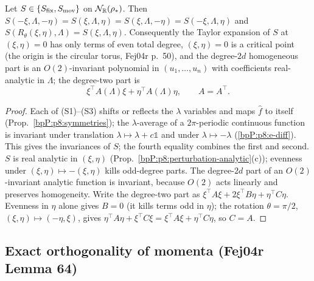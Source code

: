 \begin{corollary}\label{bpP:p8:evenness}
Let $S\in\{S_{\rm fix},S_{\rm mov}\}$ on $\mathcal N_{\mathbb{R}}(\rho_*)$. Then $S(-\xi,\Lambda,-\eta)=S(\xi,\Lambda,\eta)=S(\xi,\Lambda,-\eta)=S(-\xi,\Lambda,\eta)$ and $S(R_\theta(\xi,\eta),\Lambda)=S(\xi,\Lambda,\eta)$. Consequently the Taylor expansion of $S$ at $(\xi,\eta)=0$ has only terms of even total degree, $(\xi,\eta)=0$ is a critical point (the origin is the circular torus, Fej04r p.~50), and the degree-$2d$ homogeneous part is an $O(2)$-invariant polynomial in $(u_1,\dots,u_n)$ with coefficients real-analytic in $\Lambda$; the degree-two part is
\begin{equation}\label{bpP:p8:eq:quad-struct}
\xi^{\top}A(\Lambda)\xi+\eta^{\top}A(\Lambda)\eta,\qquad A=A^{\top}.
\end{equation}
\end{corollary}
\begin{proof}
\label{stepP:p8:ev-inv} Each of (S1)--(S3) shifts or reflects the $\lambda$ variables and maps $\hat f$ to itself (Prop.~\ref{bpP:p8:symmetries}); the $\lambda$-average of a $2\pi$-periodic continuous function is invariant under translation $\lambda\mapsto\lambda+c\mathbb 1$ and under $\lambda\mapsto-\lambda$ (\ref{bpP:p8:e-diff}). This gives the invariances of $S$; the fourth equality combines the first and second.
\label{stepP:p8:ev-tay} $S$ is real analytic in $(\xi,\eta)$ (Prop.~\ref{bpP:p8:perturbation-analytic}(c)); evenness under $(\xi,\eta)\mapsto-(\xi,\eta)$ kills odd-degree parts. The degree-$2d$ part of an $O(2)$-invariant analytic function is invariant, because $O(2)$ acts linearly and preserves homogeneity.
\label{stepP:p8:ev-quad} Write the degree-two part as $\xi^\top A\xi+2\xi^\top B\eta+\eta^\top C\eta$. Evenness in $\eta$ alone gives $B=0$ (it kills terms odd in $\eta$); the rotation $\theta=\pi/2$, $(\xi,\eta)\mapsto(-\eta,\xi)$, gives $\eta^\top A\eta+\xi^\top C\xi=\xi^\top A\xi+\eta^\top C\eta$, so $C=A$.
\end{proof}

\subsection{Exact orthogonality of momenta (Fej04r Lemma 64)}\label{bpP:p8:sec-64}


